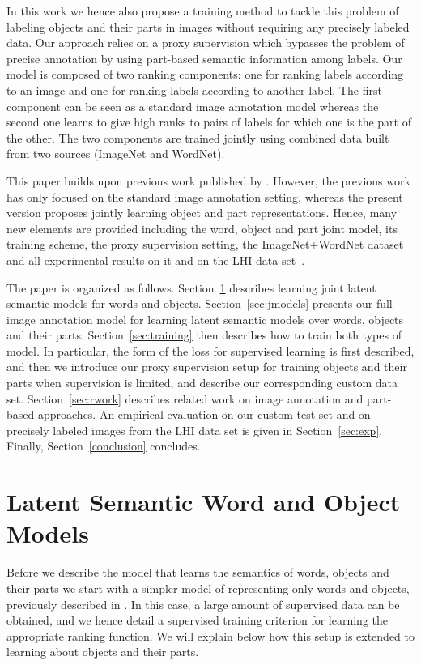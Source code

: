 In this work we hence also propose a training method to tackle this problem of labeling objects
and their parts in images without requiring any precisely labeled data.
Our approach relies on a proxy supervision which bypasses the problem
of precise annotation by using part-based semantic information among labels.
%
Our model is composed of two ranking components: one for ranking
labels according to an image and one for ranking labels according to
another label.
%
The first component can be seen as a standard image annotation model
whereas the second one learns to give high ranks to pairs of
labels for which one is the part of the other.
%
The two components are trained jointly using combined data built from two sources (ImageNet and WordNet).

This paper builds upon previous work published by \citep{image-wsabie}.
%
However, the previous work has only focused on the standard image annotation setting, whereas 
the present version proposes jointly learning 
object and part representations.
% 
Hence, many new elements are provided including the word, object and part joint model, its training scheme, the proxy 
supervision setting, the ImageNet+WordNet dataset and all experimental results on it and on the LHI data set~\citep{Yao:2007}.

The paper is organized as follows. 
Section~\ref{sec:joint-word-object} describes learning joint latent semantic models for words and objects.
Section~\ref{sec:jmodels} presents our full image annotation model for learning 
latent semantic models over words, objects and their parts.
Section~\ref{sec:training} then describes how to train both types of model.
In particular, the form of the loss for supervised learning is first described,
and then we introduce
our proxy supervision setup for training objects and their parts when supervision is limited,
 and describe our corresponding custom data set.
Section~\ref{sec:rwork} describes related work on image annotation and
part-based approaches. An empirical evaluation  on our custom test set and on precisely labeled images from
the LHI data set is given in Section~\ref{sec:exp}.
Finally, Section~\ref{conclusion} concludes.

\section{Latent Semantic Word and Object Models}\label{sec:joint-word-object} \label{jwie}

Before we describe the model that learns the semantics of words,
objects and their parts we start with a simpler model of representing
only words and objects, previously described in \citep{image-wsabie}.
In this case, a large amount of supervised data can be obtained, and
we hence detail a supervised training criterion for learning the
appropriate ranking function. We will explain below how this setup is
extended to learning about objects and their parts.

